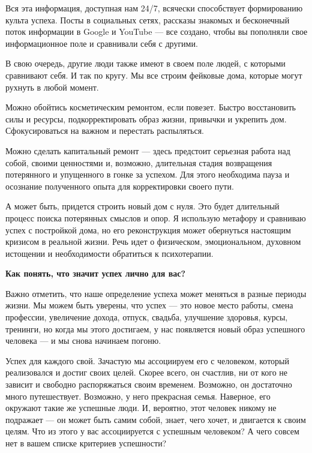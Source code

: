 Вся эта информация, доступная нам 24/7, всячески способствует формированию культа успеха. Посты в социальных сетях, рассказы знакомых и бесконечный поток информации в Google и YouTube — все создано, чтобы вы пополняли свое информационное поле и сравнивали себя с другими.

\begin{fancyquotes}
    В свою очередь, другие люди также имеют в своем поле людей, с которыми сравнивают себя. И так по кругу. Мы все строим фейковые дома, которые могут рухнуть в любой момент.
\end{fancyquotes}

Можно обойтись косметическим ремонтом, если повезет. Быстро восстановить силы и ресурсы, подкорректировать образ жизни, привычки и укрепить дом. Сфокусироваться на важном и перестать распыляться.

Можно сделать капитальный ремонт — здесь предстоит серьезная работа над собой, своими ценностями и, возможно, длительная стадия возвращения потерянного и упущенного в гонке за успехом. Для этого необходима пауза и осознание полученного опыта для корректировки своего пути.

А может быть, придется строить новый дом с нуля. Это будет длительный процесс поиска потерянных смыслов и опор. Я использую метафору и сравниваю успех с постройкой дома, но его реконструкция может обернуться настоящим кризисом в реальной жизни. Речь идет о физическом, эмоциональном, духовном истощении и необходимости обратиться к психотерапии.

\textbf{Как понять, что значит успех лично для вас?}

Важно отметить, что наше определение успеха может меняться в разные периоды жизни. Мы можем быть уверены, что успех — это новое место работы, смена профессии, увеличение дохода, отпуск, свадьба, улучшение здоровья, курсы, тренинги, но когда мы этого достигаем, у нас появляется новый образ успешного человека — и мы снова начинаем погоню.

Успех для каждого свой. Зачастую мы ассоциируем его с человеком, который реализовался и достиг своих целей. Скорее всего, он счастлив, ни от кого не зависит и свободно распоряжаться своим временем. Возможно, он достаточно много путешествует. Возможно, у него прекрасная семья. Наверное, его окружают такие же успешные люди. И, вероятно, этот человек никому не подражает — он может быть самим собой, знает, чего хочет, и двигается к своим целям. Что из этого у вас ассоциируется с успешным человеком? А чего совсем нет в вашем списке критериев успешности?


